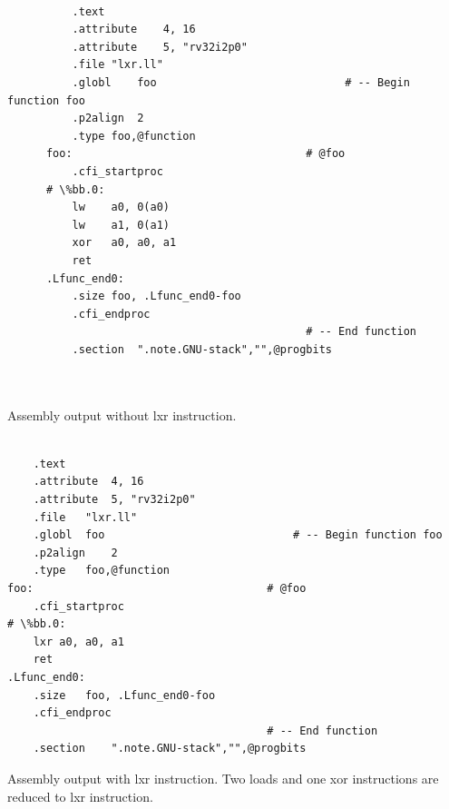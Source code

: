 \begin{lstlisting}
      
          .text
          .attribute	4, 16
          .attribute	5, "rv32i2p0"
          .file	"lxr.ll"
          .globl	foo                             # -- Begin function foo
          .p2align	2
          .type	foo,@function
      foo:                                    # @foo
          .cfi_startproc
      # \%bb.0:
          lw	a0, 0(a0)
          lw	a1, 0(a1)
          xor	a0, a0, a1
          ret
      .Lfunc_end0:
          .size	foo, .Lfunc_end0-foo
          .cfi_endproc
                                              # -- End function
          .section	".note.GNU-stack","",@progbits
      
      
\end{lstlisting}

Assembly output without lxr instruction.
\\\\


\begin{lstlisting}
    .text
	.attribute	4, 16
	.attribute	5, "rv32i2p0"
	.file	"lxr.ll"
	.globl	foo                             # -- Begin function foo
	.p2align	2
	.type	foo,@function
foo:                                    # @foo
	.cfi_startproc
# \%bb.0:
	lxr	a0, a0, a1
	ret
.Lfunc_end0:
	.size	foo, .Lfunc_end0-foo
	.cfi_endproc
                                        # -- End function
	.section	".note.GNU-stack","",@progbits
\end{lstlisting}

Assembly output with lxr instruction. Two loads and one xor instructions are reduced to lxr instruction.
\\\\